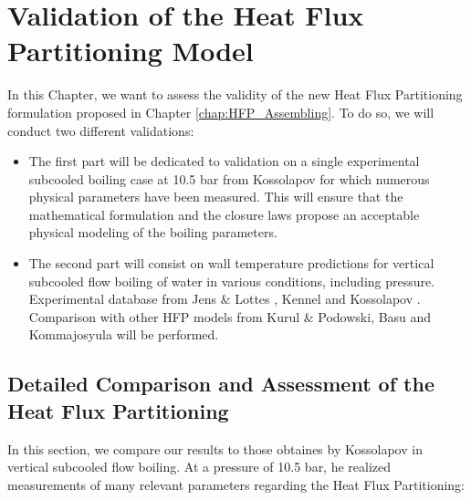
\chapter{Validation of the Heat Flux Partitioning Model} %

\label{ch:HFP_validation} %

\minitoc


In this Chapter, we want to assess the validity of the new Heat Flux Partitioning formulation proposed in Chapter \ref{chap:HFP_Assembling}. To do so, we will conduct two different validations:

\begin{itemize}
\setlength{\itemsep}{8pt}
\item The first part will be dedicated to validation on a single experimental subcooled boiling case at 10.5 bar from Kossolapov \cite{kossolapov_experimental_2021} for which numerous physical parameters have been measured. This will ensure that the mathematical formulation and the closure laws propose an acceptable physical modeling of the boiling parameters.

\item The second part will consist on wall temperature predictions for vertical subcooled flow boiling of water in various conditions, including pressure. Experimental database from Jens \& Lottes \cite{jens_analysis_1951}, Kennel \cite{kennel_local_1949} and Kossolapov \cite{kossolapov_experimental_2021}. Comparison with other HFP models from Kurul \& Podowski, Basu and Kommajosyula will be performed.
\end{itemize}


\section{Detailed Comparison and Assessment of the Heat Flux Partitioning}

In this section, we compare our results to those obtaines by Kossolapov \cite{kossolapov_experimental_2021} in vertical subcooled flow boiling. At a pressure of 10.5 bar, he realized measurements of many relevant parameters regarding the Heat Flux Partitioning:

